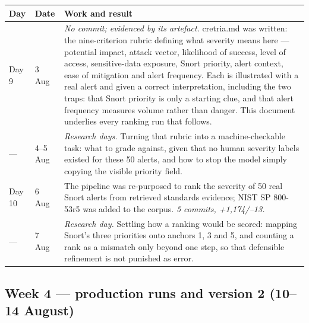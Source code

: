 \documentclass[11pt,a4paper]{article}
\newcommand{\code}[1]{{\small\ttfamily #1}}
\begin{document}
{\small
\begin{tabularx}{\textwidth}{@{}p{15mm} p{11mm} L@{}}
\toprule
\textbf{Day} & \textbf{Date} & \textbf{Work and result} \\
\midrule
\endhead
Day 9 & 3 Aug & \emph{No commit; evidenced by its artefact.} \code{cretria.md} was
  written: the nine-criterion rubric defining what severity means here --- potential
  impact, attack vector, likelihood of success, level of access, sensitive-data
  exposure, Snort priority, alert context, ease of mitigation and alert frequency.
  Each is illustrated with a real alert and given a correct interpretation, including
  the two traps: that Snort priority is only a starting clue, and that alert frequency
  measures volume rather than danger. This document underlies every ranking run that
  follows. \\
--- & 4--5 Aug & \emph{Research days.} Turning that rubric into a machine-checkable
  task: what to grade against, given that no human severity labels existed for these
  50 alerts, and how to stop the model simply copying the visible priority field. \\
Day 10 & 6 Aug & The pipeline was re-purposed to rank the severity of 50 real Snort
  alerts from retrieved standards evidence; NIST SP 800-53r5 was added to the corpus.
  \emph{5 commits, +1{,}174/--13.} \\
--- & 7 Aug & \emph{Research day.} Settling how a ranking would be scored: mapping
  Snort's three priorities onto anchors 1, 3 and 5, and counting a rank as a mismatch
  only beyond one step, so that defensible refinement is not punished as error. \\
\bottomrule
\end{tabularx}
}

\subsection{Week 4 --- production runs and version 2 (10--14 August)}
\end{document}
